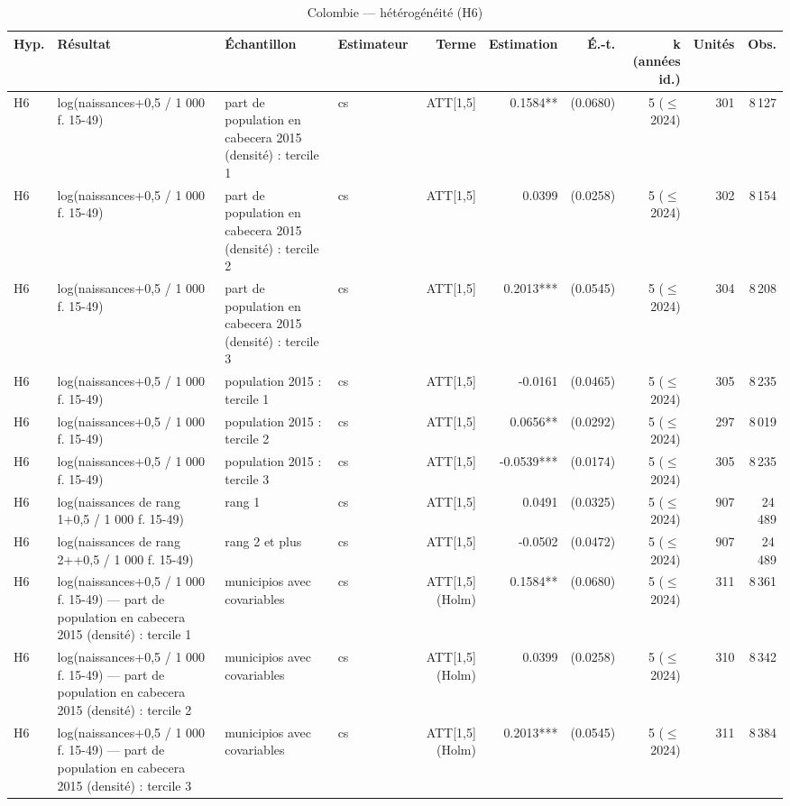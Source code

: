 \begin{table}\centering
\begin{threeparttable}
\caption{Colombie — hétérogénéité (H6)}\label{tab:co_h6}
\scriptsize
\begin{tabular}{lp{6.7cm}p{5.2cm}lrrrrrr}
\toprule
Hyp. & Résultat & Échantillon & Estimateur & Terme & Estimation & É.-t. & k (années id.) & Unités & Obs. \\
\midrule
H6 & log(naissances+0,5 / 1 000 f. 15-49) & part de population en cabecera 2015 (densité) : tercile 1 & cs & ATT[1,5] & 0.1584** & (0.0680) & 5 ($\leq$ 2024) & 301 & 8\,127 \\
H6 & log(naissances+0,5 / 1 000 f. 15-49) & part de population en cabecera 2015 (densité) : tercile 2 & cs & ATT[1,5] & 0.0399 & (0.0258) & 5 ($\leq$ 2024) & 302 & 8\,154 \\
H6 & log(naissances+0,5 / 1 000 f. 15-49) & part de population en cabecera 2015 (densité) : tercile 3 & cs & ATT[1,5] & 0.2013*** & (0.0545) & 5 ($\leq$ 2024) & 304 & 8\,208 \\
H6 & log(naissances+0,5 / 1 000 f. 15-49) & population 2015 : tercile 1 & cs & ATT[1,5] & -0.0161 & (0.0465) & 5 ($\leq$ 2024) & 305 & 8\,235 \\
H6 & log(naissances+0,5 / 1 000 f. 15-49) & population 2015 : tercile 2 & cs & ATT[1,5] & 0.0656** & (0.0292) & 5 ($\leq$ 2024) & 297 & 8\,019 \\
H6 & log(naissances+0,5 / 1 000 f. 15-49) & population 2015 : tercile 3 & cs & ATT[1,5] & -0.0539*** & (0.0174) & 5 ($\leq$ 2024) & 305 & 8\,235 \\
H6 & log(naissances de rang 1+0,5 / 1 000 f. 15-49) & rang 1 & cs & ATT[1,5] & 0.0491 & (0.0325) & 5 ($\leq$ 2024) & 907 & 24\,489 \\
H6 & log(naissances de rang 2++0,5 / 1 000 f. 15-49) & rang 2 et plus & cs & ATT[1,5] & -0.0502 & (0.0472) & 5 ($\leq$ 2024) & 907 & 24\,489 \\
H6 & log(naissances+0,5 / 1 000 f. 15-49) — part de population en cabecera 2015 (densité) : tercile 1 & municipios avec covariables & cs & ATT[1,5] (Holm) & 0.1584** & (0.0680) & 5 ($\leq$ 2024) & 311 & 8\,361 \\
H6 & log(naissances+0,5 / 1 000 f. 15-49) — part de population en cabecera 2015 (densité) : tercile 2 & municipios avec covariables & cs & ATT[1,5] (Holm) & 0.0399 & (0.0258) & 5 ($\leq$ 2024) & 310 & 8\,342 \\
H6 & log(naissances+0,5 / 1 000 f. 15-49) — part de population en cabecera 2015 (densité) : tercile 3 & municipios avec covariables & cs & ATT[1,5] (Holm) & 0.2013*** & (0.0545) & 5 ($\leq$ 2024) & 311 & 8\,384 \\

\end{tabular}
\end{threeparttable}
\end{table}
